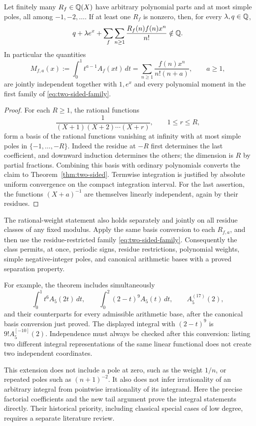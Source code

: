 \begin{corollary}
\label{cor:simple-poles}
Let finitely many $R_f\in\mathbb Q(X)$ have arbitrary polynomial parts and
at most simple poles, all among $-1,-2,\ldots$.  If at least one
$R_f$ is nonzero, then, for every $\lambda,q\in\mathbb Q$,
\[
 q+\lambda e^x+
 \sum_f\sum_{n\geq1}\frac{R_f(n)f(n)x^n}{n!}\notin\mathbb Q.
\]
In particular the quantities
\[
 M_{f,a}(x):=\int_0^1t^{a-1}A_f(xt)\,dt
           =\sum_{n\geq1}\frac{f(n)x^n}{n!(n+a)},\qquad a\geq1,
\]
are jointly independent together with $1,e^x$ and every polynomial
moment in the first family of \eqref{eq:two-sided-family}.
\end{corollary}
\begin{proof}
For each $R\geq1$, the rational functions
\[
 \frac1{(X+1)(X+2)\cdots(X+r)},\qquad 1\leq r\leq R,
\]
form a basis of the rational functions vanishing at infinity with
at most simple poles in $\{-1,\ldots,-R\}$.  Indeed the residue at
$-R$ first determines the last coefficient, and downward induction
determines the others; the dimension is $R$ by partial fractions.
Combining this basis with ordinary polynomials converts the claim
to Theorem~\ref{thm:two-sided}.  Termwise integration is justified
by absolute uniform convergence on the compact integration interval.
For the last assertion, the functions $(X+a)^{-1}$ are themselves
linearly independent, again by their residues.
\end{proof}

The rational-weight statement also holds separately and jointly on all
residue classes of any fixed modulus. Apply the same basis conversion
to each $R_{f,a}$, and then use the residue-restricted family
\eqref{eq:two-sided-family}.  Consequently the class permits, at once,
periodic signs, residue restrictions, polynomial weights, simple
negative-integer poles, and canonical arithmetic bases with a proved
separation property.

For example, the theorem includes simultaneously
\[
 \int_0^1t^6A_5(2t)\,dt,
 \qquad \int_0^2(2-t)^9A_5(t)\,dt,
 \qquad A_5^{(17)}(2),
\]
and their counterparts for every admissible arithmetic base, after
the canonical basis conversion just proved.  The displayed integral
with $(2-t)^9$ is $9!A_5^{[-10]}(2)$.  Independence must always be
checked after this conversion: listing two different integral
representations of the same linear functional does not create two
independent coordinates.

This extension does not include a pole at zero, such as the weight
$1/n$, or repeated poles such as $(n+1)^{-2}$.  It also does not infer
irrationality of an arbitrary integral from pointwise irrationality
of its integrand.  Here the precise factorial coefficients and the
new tail argument prove the integral statements directly.  Their
historical priority, including classical special cases of low degree,
requires a separate literature review.


